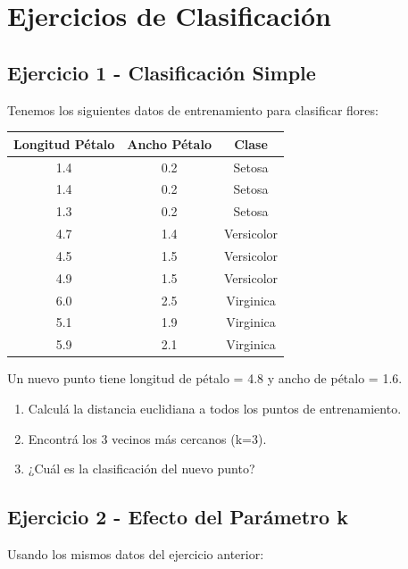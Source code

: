 \documentclass[12pt]{article}
\begin{document}
\section{Ejercicios de Clasificación}

\subsection{Ejercicio 1 - Clasificación Simple}

Tenemos los siguientes datos de entrenamiento para clasificar flores:

\begin{table}[H]
    \centering
    \begin{tabular}{ccc}
        \toprule
        \textbf{Longitud Pétalo} & \textbf{Ancho Pétalo} & \textbf{Clase} \\
        \midrule
        1.4 & 0.2 & Setosa \\
        1.4 & 0.2 & Setosa \\
        1.3 & 0.2 & Setosa \\
        4.7 & 1.4 & Versicolor \\
        4.5 & 1.5 & Versicolor \\
        4.9 & 1.5 & Versicolor \\
        6.0 & 2.5 & Virginica \\
        5.1 & 1.9 & Virginica \\
        5.9 & 2.1 & Virginica \\
        \bottomrule
    \end{tabular}
\end{table}

Un nuevo punto tiene longitud de pétalo = 4.8 y ancho de pétalo = 1.6.

\begin{enumerate}
    \item Calculá la distancia euclidiana a todos los puntos de entrenamiento.
    \item Encontrá los 3 vecinos más cercanos (k=3).
    \item ¿Cuál es la clasificación del nuevo punto?
\end{enumerate}

\subsection{Ejercicio 2 - Efecto del Parámetro k}

Usando los mismos datos del ejercicio anterior:
\end{document}
